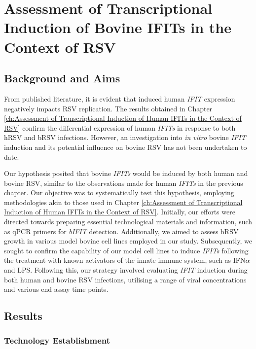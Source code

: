 \chapter{Assessment of Transcriptional Induction of Bovine IFITs in the Context of RSV} \label{ch:Assessment of Transcriptional Induction of Bovine IFITs in the Context of RSV}
\section{Background and Aims} \label{sec:Background and Aims Chapter2}
From published literature, it is evident that induced human \textit{IFIT} expression negatively impacts RSV replication. The results obtained in Chapter \ref{ch:Assessment of Transcriptional Induction of Human IFITs in the Context of RSV} confirm the differential expression of human \textit{IFITs} in response to both hRSV and bRSV infections. However, an investigation into \textit{in vitro} bovine \textit{IFIT} induction and its potential influence on bovine RSV has not been undertaken to date.

Our hypothesis posited that bovine \textit{IFITs} would be induced by both human and bovine RSV, similar to the observations made for human \textit{IFITs} in the previous chapter. Our objective was to systematically test this hypothesis, employing methodologies akin to those used in Chapter \ref{ch:Assessment of Transcriptional Induction of Human IFITs in the Context of RSV}. Initially, our efforts were directed towards preparing essential technological materials and information, such as qPCR primers for \textit{bIFIT} detection. Additionally, we aimed to assess bRSV growth in various model bovine cell lines employed in our study. Subsequently, we sought to confirm the capability of our model cell lines to induce \textit{IFITs} following the treatment with known activators of the innate immune system, such as IFN\(\alpha\) and LPS. Following this, our strategy involved evaluating \textit{IFIT} induction during both human and bovine RSV infections, utilising a range of viral concentrations and various end assay time points.

\section{Results} \label{sec:Results Chapter2}
\subsection{Technology Establishment} \label{subsec:Technology Establishment}
